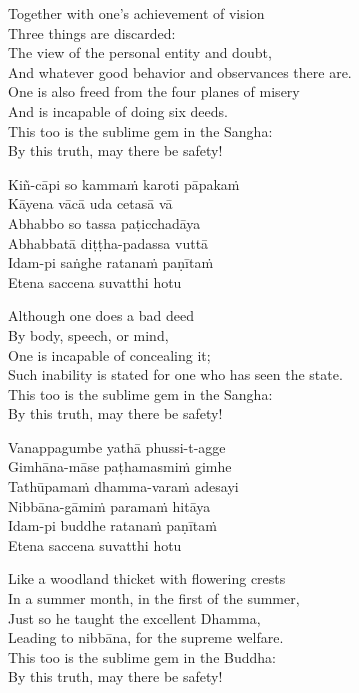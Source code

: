 \begin{english}
  Together with one’s achievement of vision\\
  Three things are discarded:\\
  The view of the personal entity and doubt,\\
  And whatever good behavior and observances there are.\\
  One is also freed from the four planes of misery\\
  And is incapable of doing six deeds.\\
  This too is the sublime gem in the Sangha:\\
  By this truth, may there be safety!
\end{english}

Kiñ-cāpi so kammaṁ karoti pāpakaṁ\\
Kāyena vācā uda cetasā vā\\
Abhabbo so tassa paṭicchadāya\\
Abhabbatā diṭṭha-padassa vuttā\\
Idam-pi saṅghe ratanaṁ paṇītaṁ\\
Etena saccena suvatthi hotu

\begin{english}
  Although one does a bad deed\\
  By body, speech, or mind,\\
  One is incapable of concealing it;\\
  Such inability is stated for one who has seen the state.\\
  This too is the sublime gem in the Sangha:\\
  By this truth, may there be safety!
\end{english}

Vanappagumbe yathā phussi-t-agge\\
Gimhāna-māse paṭhamasmiṁ gimhe\\
Tathūpamaṁ dhamma-varaṁ adesayi\\
Nibbāna-gāmiṁ paramaṁ hitāya\\
Idam-pi buddhe ratanaṁ paṇītaṁ\\
Etena saccena suvatthi hotu

\begin{english}
  Like a woodland thicket with flowering crests\\
  In a summer month, in the first of the summer,\\
  Just so he taught the excellent Dhamma,\\
  Leading to nibbāna, for the supreme welfare.\\
  This too is the sublime gem in the Buddha:\\
  By this truth, may there be safety!
\end{english}

